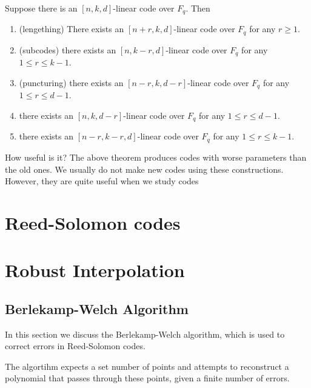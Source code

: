 \begin{theorem}
    Suppose there is an $[n, k, d]$-linear code over $F_q$. Then
    \begin{enumerate}
        \item (lengething) There exists an $[n + r, k, d]$-linear code over 
        $F_q$ for any $r \ge 1$.

        \item (subcodes) there exists an $[n, k-r, d]$-linear code over $F_q$ for any 
        $1 \le r \le k- 1$.

        \item (puncturing) there exists an $[n- r, k, d- r]$-linear code over $F_q$ for any
        $1 \le r \le d- 1$.

        \item there exists an $[n, k, d- r]$-linear code over
         $F_q$ for any $1 \le r \le d- 1$.
        
        \item there exists an $[n- r, k- r, d]$-linear code over
         $F_q$ for any $1 \le r \le k- 1$.
    \end{enumerate}
\end{theorem}

\begin{bclogo}[couleur=blue!10, arrondi=0.1, logo=\bcinfo]{How useful is it?}
The above theorem produces codes with worse
parameters than the old ones. We usually do not make new codes using these
constructions. However, they are quite useful when we study codes
\end{bclogo}


\section{Reed-Solomon codes}


\section{Robust Interpolation}
\subsection{Berlekamp-Welch Algorithm}
In this section we discuss the Berlekamp-Welch algorithm, 
which is used to correct errors in Reed-Solomon codes.

The algortihm expects a set number of points and attempts to reconstruct 
a polynomial that passes through these points, given a finite number of errors.

